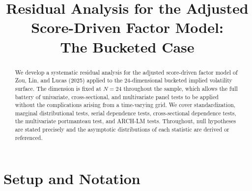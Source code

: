 \documentclass[12pt]{article}
\title{Residual Analysis for the Adjusted Score-Driven Factor Model:\\
The Bucketed Case}
\date{}
\begin{document}
\maketitle

\begin{abstract}
We develop a systematic residual analysis for the adjusted score-driven factor model
of Zou, Lin, and Lucas (2025) applied to the 24-dimensional bucketed implied volatility
surface. The dimension is fixed at $N = 24$ throughout the sample, which allows the full
battery of univariate, cross-sectional, and multivariate panel tests to be applied without
the complications arising from a time-varying grid. We cover standardization, marginal
distributional tests, serial dependence tests, cross-sectional dependence tests, the multivariate
portmanteau test, and ARCH-LM tests. Throughout, null hypotheses are stated precisely and
the asymptotic distributions of each statistic are derived or referenced.
\end{abstract}

\tableofcontents
\newpage

\section{Setup and Notation}
\end{document}
